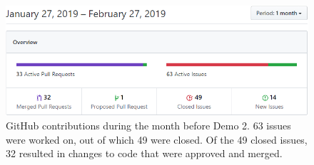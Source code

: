 \documentclass[a4paper]{article}
\begin{document}
\begin{center}
\begin{figure}[!htb]
  \includegraphics[width=\linewidth]{github-contributions.PNG}
  \caption{GitHub contributions during the month before Demo 2. 63 issues were worked on, out of which 49 were closed. Of the 49 closed issues, 32 resulted in changes to code that were approved and merged.}\label{fig:awesome_image3}
\end{figure}

\end{center}
  
\end{document}
